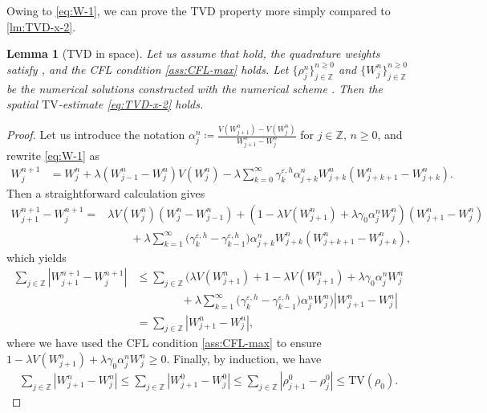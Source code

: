 \documentclass[10pt]{amsart}
\theoremstyle{plain}
\newtheorem{lemma}{Lemma}[section]
\theoremstyle{definition}
\numberwithin{equation}{section}
\newcommand{\eps}{{\varepsilon}}
\begin{document}
Owing to \cref{eq:W-1}, we can prove the TVD property more simply compared to \cref{lm:TVD-x-2}. 

\begin{lemma}[TVD in space]\label{lm:TVD-x}
Let us assume that  hold, the quadrature weights satisfy , and the CFL condition \cref{ass:CFL-max} holds. 
Let $\{\rho_j^n\}_{j\in\mathbb{Z}}^{n\geq0}$ and $\{W_j^n\}_{j\in\mathbb{Z}}^{n\geq0}$ be the numerical solutions constructed with the numerical scheme . Then the spatial $\mathrm{TV}$-estimate \cref{eq:TVD-x-2} holds.
\end{lemma}

\begin{proof}

Let us introduce the notation $\alpha_j^n \coloneqq \frac{V(W_{j+1}^n) - V(W_j^n)}{W_{j+1}^n - W_j^n}$ for $j\in\mathbb{Z},\,n\geq0$, and rewrite \cref{eq:W-1} as 
\begin{align*}
    W_j^{n+1} &= W_j^n + \lambda \left( W_{j-1}^n  - W_j^n \right) V(W_j^n) - \lambda \sum_{k=0}^\infty \gamma_k^{\eps,h} \alpha_{j+k}^n W_{j+k}^n \left( W_{j+k+1}^n - W_{j+k}^n \right).
\end{align*}
Then a straightforward calculation gives
\begin{align*}
    W^{n+1}_{j+1} - W^{n+1}_j =& \lambda V(W_j^n) (W_j^n-W_{j-1}^n) + \left( 1 - \lambda V(W_{j+1}^n) + \lambda \gamma_0\alpha_j^nW_j^n \right) (W_{j+1}^n-W_j^n) \\
    &\qquad + \lambda \sum_{k=1}^\infty \big(\gamma_k^{\eps,h} - \gamma_{k-1}^{\eps,h}\big) \alpha_{j+k}^n W_{j+k}^n (W_{j+k+1}^n - W_{j+k}^n),
\end{align*}
which yields
\begin{align*}
    \sum_{j \in \mathbb Z} |W^{n+1}_{j+1} - W^{n+1}_j| &\leq \sum_{j \in \mathbb Z} \Big( \lambda V(W_{j+1}^n) + 1 - \lambda V(W_{j+1}^n) +  \lambda \gamma_0\alpha_j^nW_j^n  \\ & \qquad\qquad + \lambda \sum_{k=1}^\infty \big(\gamma_k^{\eps,h}  - \gamma_{k-1}^{\eps,h}\big) \alpha_j^nW_j^n \Big) |W^n_{j+1} - W^n_j| \\
    &= \sum_{j \in \mathbb Z} |W^n_{j+1} - W^n_j|,
\end{align*}
where we have used the CFL condition \cref{ass:CFL-max} to ensure $1 - \lambda V(W_{j+1}^n) + \lambda \gamma_0\alpha_j^nW_j^n \geq0$.
Finally, by induction, we have 
\begin{align*}
    \sum_{j \in \mathbb Z} |W^n_{j+1} - W^n_j| \leq  \sum_{j \in \mathbb Z}  |W_{j+1}^0-W_j^0| \leq \sum_{j \in \mathbb Z} |\rho^0_{j+1} - \rho^0_j| \leq \mathrm{TV}(\rho_0).
\end{align*}
\end{proof}
\end{document}
